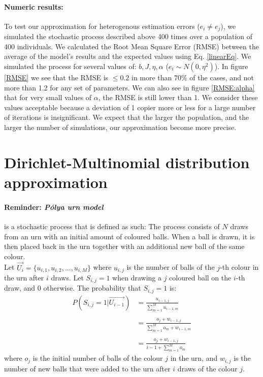 \documentclass[11pt]{article}
\begin{document}
\paragraph{Numeric results:} To test our approximation for heterogenous estimation errors ($e_i \ne e_j$), we simulated the stochastic process described above 400 times over a population of 400 individuals.
We calculated the Root Mean Square Error (RMSE) between the average of the model's results and the expected values using Eq. \ref{linearEq}.
 We simulated the process for several values of: $b,J,\eta,\alpha$ ($e_i \sim N(0,\eta^2)$).
 In figure \ref{RMSE} we see that the RMSE is $\le 0.2$ in more than 70\% of the cases, and not more than 1.2 for any set of parameters.
 We can also see in figure \ref{RMSE:alpha} that for very small values of $\alpha$, the RMSE is still lower than 1. 
We consider these values acceptable because a deviation of 1 copier more or less for a large number of iterations is insignificant. 
We expect that the larger the population, and the larger the number of simulations, our approximation become more precise.

\clearpage

\section*{Dirichlet-Multinomial distribution approximation}
\paragraph{Reminder: \textit{Pólya urn model}}  is a stochastic process that is defined as such: 
The process consists of $N$ draws from an urn with an initial amount of coloured balls. When a ball is drawn, it is then placed back in the urn together with an additional new ball of the same colour.\\
Let $\overrightarrow{U_i} = \{u_{i,1},u_{i,2},...,u_{i,M}\}$  where $u_{i,j}$ is the number of balls of the $j$-th colour in the urn after $i$ draws.
Let $S_{i,j}=1$ when drawing a $j$ coloured ball on the $i$-th draw, and $0$ otherwise. The probability that $S_{i,j}=1$ is:
\begin{equation}\label{polya}
\begin{split}
P(S_{i,j} = 1 | \overrightarrow{U_{i-1}}) & = \frac{u_{i-1,j}}{\sum\limits_{m=1}^{M} u_{i-1,m}}\\\\
 & = \frac{o_j + w_{i-1,j}}{\sum\limits_{m=1}^{M} o_m + w_{i-1,m}}\\\\
 & = \frac{o_j + w_{i-1,j}}{i-1 + \sum\limits_{m=1}^{M} o_m}
\end{split}
\end{equation}
where $o_j$ is the initial number of balls of the colour $j$ in the urn, and $w_{i,j}$ is the number of new balls that were added to the urn after $i$ draws of the colour $j$.
\end{document}
